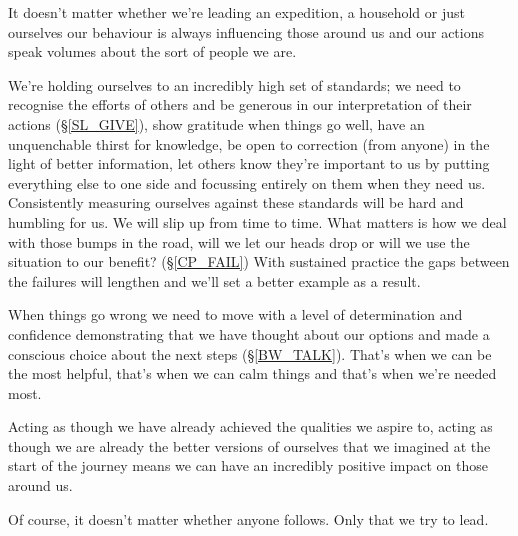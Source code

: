 \cleardoublepage
{\small

It doesn't matter whether we're leading an expedition, a household or just ourselves our behaviour is always influencing those around us and our actions speak volumes about the sort of people we are.

We're holding ourselves to an incredibly high set of standards; we need to recognise the efforts of others and be generous in our interpretation of their actions (\S \ref{SL_GIVE}), show gratitude when things go well, have an unquenchable thirst for knowledge, be open to correction (from anyone) in the light of better information, let others know they're important to us by putting everything else to one side and focussing entirely on them when they need us. Consistently measuring ourselves against these standards will be hard and humbling for us. We will slip up from time to time. What matters is how we deal with those bumps in the road, will we let our heads drop or will we use the situation to our benefit? (\S \ref{CP_FAIL}) With sustained practice the gaps between the failures will lengthen and we'll set a better example as a result.

When things go wrong we need to move with a level of determination and confidence demonstrating that we have thought about our options and made a conscious choice about the next steps (\S \ref{BW_TALK}). That's when we can be the most helpful, that's when we can calm things and that's when we're needed most.

Acting as though we have already achieved the qualities we aspire to, acting as though we are already the better versions of ourselves that we imagined at the start of the journey means we can have an incredibly positive impact on those around us.

Of course, it doesn't matter whether anyone follows. Only that we try to lead.

}
\clearpage
